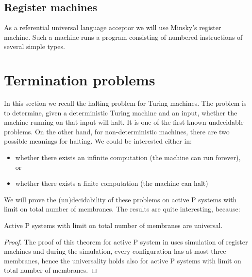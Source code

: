 \documentclass[llncs,submission,copyright,creativecommons]{../lib/lncs/llncs}
\begin{document}



\subsection{Register machines} %
\label{sub:register_machines}
  As a referential universal language acceptor we will use Minsky's register machine. Such a machine runs a program consisting of numbered instructions of several simple types.


  

\section{Termination problems} %
\label{sec:termination_problems}

In this section we recall the halting problem for Turing machines. The problem is to determine, given a deterministic Turing machine and an input, whether the machine running on that input will halt. It is one of the first known undecidable problems. On the other hand, for non-deterministic machines, there are two possible meanings for halting. We could be interested either in:
\begin{itemize}
  \item whether there exists an infinite computation (the machine can run forever), or
  \item whether there exists a finite computation (the machine can halt)
\end{itemize}

We will prove the (un)decidability of these problems on active P systems with limit on total number of membranes. The results are quite interesting, because:

\begin{theorem}
  Active P systems with limit on total number of membranes are universal.
\end{theorem}

\begin{proof}
  The proof of this theorem for active P system in \cite{Ibarra05Active} uses simulation of register machines and during the simulation, every configuration has at most three membranes, hence the universality holds also for active P systems with limit on total number of membranes.
\end{proof}
\end{document}
